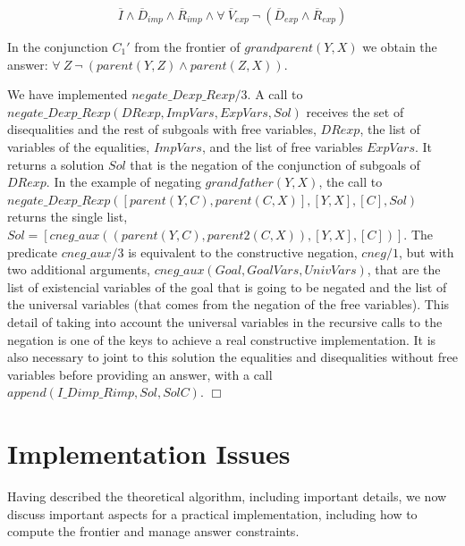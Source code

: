 \documentclass{tlp}
\newcommand{\implementation}[1]{\noindent{\sc Implementation details:}
  #1 $\Box$}
\begin{document}
\begin{itemize}
           \[\overline{I} \wedge \overline{D}_{imp}
           \wedge \overline{R}_{imp} \wedge \forall~
           \overline{V}_{exp}~ \neg~(\overline{D}_{exp} \wedge
           \overline{R}_{exp})\]

	   In the conjunction $C_1'$ from the frontier of $grandparent(Y,X)$
           we obtain the answer: $\forall~ Z ~ \neg~(parent(Y,Z) \wedge
           parent(Z,X))$.

\implementation{
We have implemented 
$negate\_Dexp\_Rexp/3$. A call to
$negate\_Dexp\_Rexp(DRexp,ImpVars,ExpVars,Sol)$ receives the set of
disequalities and the rest of subgoals with free variables, $DRexp$, the list
of variables of the equalities, $ImpVars$, and the list of free variables
$ExpVars$. It returns a solution $Sol$ that is the negation of the conjunction
of subgoals of $DRexp$.  In the example of negating $grandfather(Y,X)$, the
call to $negate\_Dexp\_Rexp([parent(Y,C),parent(C,X)],[Y,X],[C],Sol)$ returns
the single list,
$Sol=[cneg\_aux((parent(Y,C),parent2(C,X)),[Y,X],[C])]$. The predicate
$cneg\_aux/3$ is equivalent to the constructive negation, $cneg/1$, but with
two additional arguments, $cneg\_aux(Goal,GoalVars,UnivVars)$, that are the
list of existencial variables of the goal that is going to be negated and the
list of the universal variables (that comes from the negation of the free
variables). This detail of taking into account the universal variables in the
recursive calls to the negation is one of the keys to achieve a real
constructive implementation. It is also necessary to joint to this solution
the equalities and disequalities without free variables before providing an
answer, with a call $append(I\_Dimp\_Rimp,Sol,SolC)$.
}

         \end{itemize}


    


\section{Implementation Issues}
\label{implementation}

Having described the theoretical algorithm, including important
details, we now discuss important aspects for a practical
implementation, including how to compute the frontier and manage
answer constraints.
\end{document}
